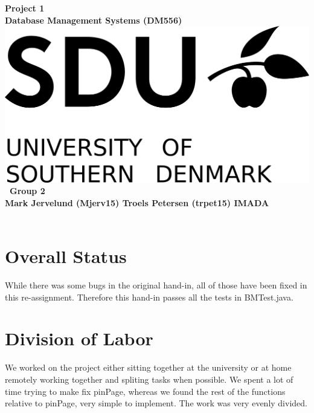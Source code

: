 \documentclass[a4paper,10pt,titlepage]{report}
\date{}
\begin{document}
\begin{titlepage}
\centering
    \vspace*{9\baselineskip}
    \huge
    \bfseries
    Project 1\\
    
    \normalfont 
	\huge    
    Database Management Systems (DM556)  \\[4\baselineskip]
    \normalfont
	\includegraphics[scale=1.5]{SDU_Logo}
    \vfill\
    Group 2\\
    Mark Jervelund (Mjerv15) Troels Petersen (trpet15)
    \vspace{5mm}
    IMADA \\
    \textbf{\datedate} \\[2\baselineskip]
\end{titlepage}

\setcounter{page}{1}
\renewcommand{\thepage}{\arabic{page}}

\lstset{language=Java}          %
\section{Overall Status}
While there was some bugs in the original hand-in, all of those have been fixed in this re-assignment. Therefore this hand-in passes all the tests in \textsf{BMTest.java}.
\section{Division of Labor}
We worked on the project either sitting together at the university or at home remotely working together and spliting tasks when possible. We spent a lot of time trying to make fix pinPage, whereas we found the rest of the functions relative to pinPage, very simple to implement. The work was very evenly divided.
\end{document}

